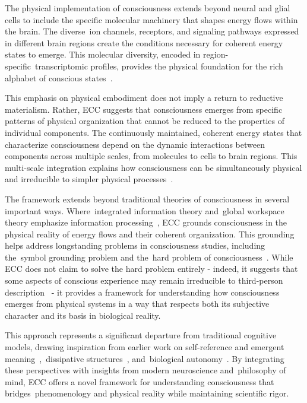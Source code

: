 The physical implementation of consciousness extends beyond neural and glial cells to include the specific molecular machinery that shapes energy flows within the brain. The diverse~ion channels, receptors, and signaling pathways expressed in different brain regions create the conditions necessary for coherent energy states to emerge. This molecular diversity, encoded in region-specific~transcriptomic profiles, provides the physical foundation for the rich alphabet of conscious states~\cite{Hawrylycz2012,pinotsis2023cytoelectric}.

This emphasis on physical embodiment does not imply a return to reductive materialism. Rather, ECC suggests that consciousness emerges from specific patterns of physical organization that cannot be reduced to the properties of individual components. The continuously maintained, coherent energy states that characterize consciousness depend on the dynamic interactions between components across multiple scales, from molecules to cells to brain regions. This multi-scale integration explains how consciousness can be simultaneously physical and irreducible to simpler physical processes~\cite{maturana1991autopoiesis,thompson2010mind}.

The framework extends beyond traditional theories of consciousness in several important ways. Where~integrated information theory and~global workspace theory emphasize information processing~\cite{tononi2015consciousness,Baars2019}, ECC grounds consciousness in the physical reality of energy flows and their coherent organization. This grounding helps address longstanding problems in consciousness studies, including the~symbol grounding problem and the~hard problem of consciousness~\cite{harnad1990symbol,chalmers1997conscious}. While ECC does not claim to solve the hard problem entirely - indeed, it suggests that some aspects of conscious experience may remain irreducible to third-person description~\cite{nagel1980like,nagel1989view} - it provides a framework for understanding how consciousness emerges from physical systems in a way that respects both its subjective character and its basis in biological reality.

This approach represents a significant departure from traditional cognitive models, drawing inspiration from earlier work on self-reference and emergent meaning~\cite{hofstadter1999godel},~dissipative structures~\cite{prigogine2018order}, and~biological autonomy~\cite{bateson2000steps}. By integrating these perspectives with insights from modern neuroscience and~philosophy of mind, ECC offers a novel framework for understanding consciousness that bridges~phenomenology and physical reality while maintaining scientific rigor.

